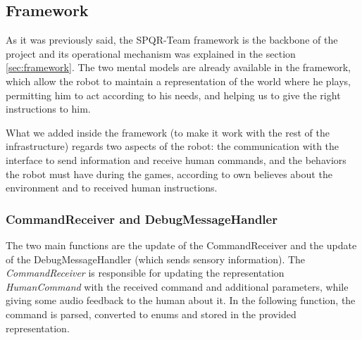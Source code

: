 \documentclass[a4paper, onecolumn, 12pt]{article}
\begin{document}
\subsection{Framework}
As it was previously said, the SPQR-Team framework is the backbone of the project and its
operational mechanism was explained in the section \ref{sec:framework}.
The two mental models are already available in the framework, which allow the robot to
maintain a representation of the world where he plays, permitting him to act according to
his needs, and helping us to give the right instructions to him. 

What we added inside the framework (to make it work with the rest of the infrastructure) 
regards two aspects of the robot: the communication with the interface to send information
and receive human commands, and the behaviors the robot must have during the games, according
to own believes about the environment and to received human instructions.

\subsubsection{CommandReceiver and DebugMessageHandler}
The two main functions are the update of the CommandReceiver and the update of the DebugMessageHandler 
(which sends sensory information). The \textit{CommandReceiver} is responsible for updating the
representation \textit{HumanCommand} with the received command and additional parameters, 
while giving some audio feedback to the human about it. 
In the following function, the command is parsed,
converted to enums and stored in the provided representation. 
\end{document}
